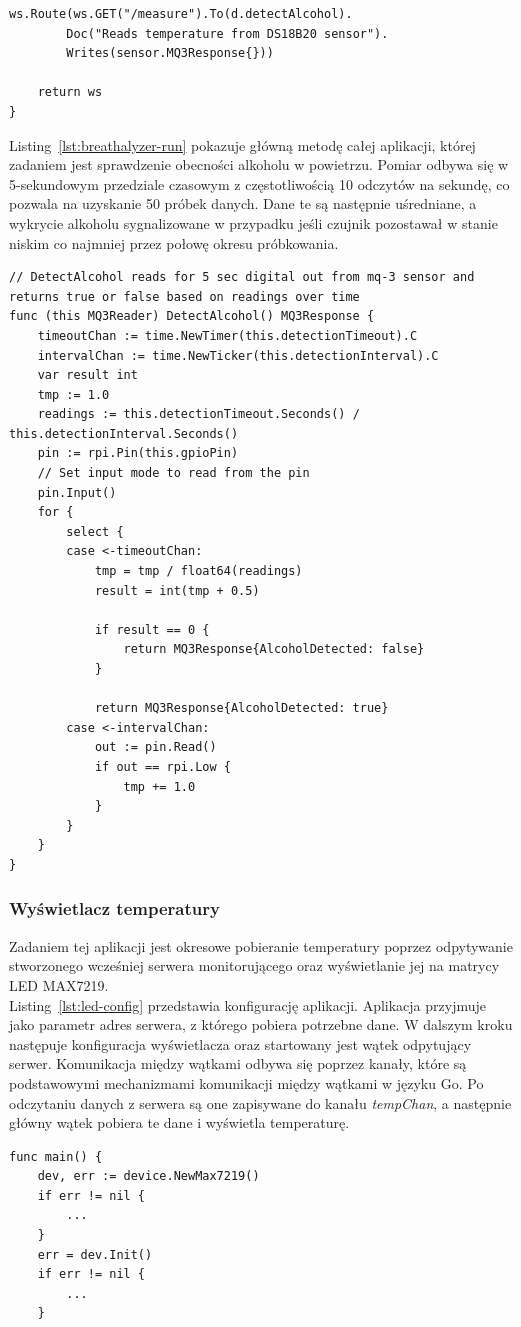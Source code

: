 \documentclass[12pt]{report}
\let\Oldsubsubsection\subsubsection
\renewcommand{\subsubsection}{\FloatBarrier\Oldsubsubsection}
\begin{document}
{\begin{lstlisting}[language=golang,caption=Konfiguracja API,label=lst:breathalyzer-api]
	ws.Route(ws.GET("/measure").To(d.detectAlcohol).
		Doc("Reads temperature from DS18B20 sensor").
		Writes(sensor.MQ3Response{}))

	return ws
}
\end{lstlisting}

\noindent Listing~\ref{lst:breathalyzer-run} pokazuje główną metodę całej aplikacji, której zadaniem jest sprawdzenie obecności alkoholu w powietrzu. Pomiar odbywa się w 5-sekundowym przedziale czasowym z częstotliwością 10 odczytów na sekundę, co pozwala na uzyskanie 50 próbek danych. Dane te są następnie uśredniane, a wykrycie alkoholu sygnalizowane w przypadku jeśli czujnik pozostawał w stanie niskim co najmniej przez połowę okresu próbkowania.
\clearpage
\begin{lstlisting}[language=golang,caption=Pomiar alkoholu w powietrzu,label=lst:breathalyzer-run]
// DetectAlcohol reads for 5 sec digital out from mq-3 sensor and returns true or false based on readings over time
func (this MQ3Reader) DetectAlcohol() MQ3Response {
	timeoutChan := time.NewTimer(this.detectionTimeout).C
	intervalChan := time.NewTicker(this.detectionInterval).C
	var result int
	tmp := 1.0
	readings := this.detectionTimeout.Seconds() / this.detectionInterval.Seconds()
	pin := rpi.Pin(this.gpioPin)
	// Set input mode to read from the pin
	pin.Input()
	for {
		select {
		case <-timeoutChan:
			tmp = tmp / float64(readings)
			result = int(tmp + 0.5)

			if result == 0 {
				return MQ3Response{AlcoholDetected: false}
			}

			return MQ3Response{AlcoholDetected: true}
		case <-intervalChan:
			out := pin.Read()
			if out == rpi.Low {
				tmp += 1.0
			}
		}
	}
}
\end{lstlisting}

\newpage
\subsubsection{Wyświetlacz temperatury}
Zadaniem tej aplikacji jest okresowe pobieranie temperatury poprzez odpytywanie stworzonego wcześniej serwera monitorującego oraz wyświetlanie jej na matrycy LED MAX7219. \\

\noindent Listing~\ref{lst:led-config} przedstawia konfigurację aplikacji. Aplikacja przyjmuje jako parametr adres serwera, z którego pobiera potrzebne dane. W dalszym kroku następuje konfiguracja wyświetlacza oraz startowany jest wątek odpytujący serwer. Komunikacja między wątkami odbywa się poprzez kanały, które są podstawowymi mechanizmami komunikacji między wątkami w języku Go. Po odczytaniu danych z serwera są one zapisywane do kanału \textit{tempChan}, a następnie główny wątek pobiera te dane i wyświetla temperaturę.
\begin{lstlisting}[language=golang,caption=Konfiguracja aplikacji,label=lst:led-config]
func main() {
	dev, err := device.NewMax7219()
	if err != nil {
		...
	}
	err = dev.Init()
	if err != nil {
		...
	}


\end{lstlisting}}
\end{document}
